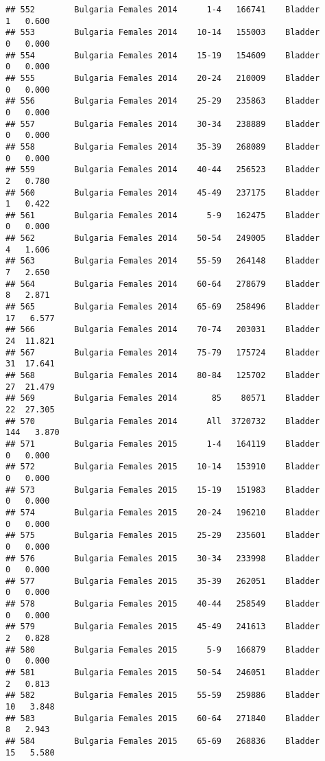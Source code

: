 \documentclass[
]{article}
\begin{document}
\begin{verbatim}
## 552        Bulgaria Females 2014      1-4   166741    Bladder      1   0.600
## 553        Bulgaria Females 2014    10-14   155003    Bladder      0   0.000
## 554        Bulgaria Females 2014    15-19   154609    Bladder      0   0.000
## 555        Bulgaria Females 2014    20-24   210009    Bladder      0   0.000
## 556        Bulgaria Females 2014    25-29   235863    Bladder      0   0.000
## 557        Bulgaria Females 2014    30-34   238889    Bladder      0   0.000
## 558        Bulgaria Females 2014    35-39   268089    Bladder      0   0.000
## 559        Bulgaria Females 2014    40-44   256523    Bladder      2   0.780
## 560        Bulgaria Females 2014    45-49   237175    Bladder      1   0.422
## 561        Bulgaria Females 2014      5-9   162475    Bladder      0   0.000
## 562        Bulgaria Females 2014    50-54   249005    Bladder      4   1.606
## 563        Bulgaria Females 2014    55-59   264148    Bladder      7   2.650
## 564        Bulgaria Females 2014    60-64   278679    Bladder      8   2.871
## 565        Bulgaria Females 2014    65-69   258496    Bladder     17   6.577
## 566        Bulgaria Females 2014    70-74   203031    Bladder     24  11.821
## 567        Bulgaria Females 2014    75-79   175724    Bladder     31  17.641
## 568        Bulgaria Females 2014    80-84   125702    Bladder     27  21.479
## 569        Bulgaria Females 2014       85    80571    Bladder     22  27.305
## 570        Bulgaria Females 2014      All  3720732    Bladder    144   3.870
## 571        Bulgaria Females 2015      1-4   164119    Bladder      0   0.000
## 572        Bulgaria Females 2015    10-14   153910    Bladder      0   0.000
## 573        Bulgaria Females 2015    15-19   151983    Bladder      0   0.000
## 574        Bulgaria Females 2015    20-24   196210    Bladder      0   0.000
## 575        Bulgaria Females 2015    25-29   235601    Bladder      0   0.000
## 576        Bulgaria Females 2015    30-34   233998    Bladder      0   0.000
## 577        Bulgaria Females 2015    35-39   262051    Bladder      0   0.000
## 578        Bulgaria Females 2015    40-44   258549    Bladder      0   0.000
## 579        Bulgaria Females 2015    45-49   241613    Bladder      2   0.828
## 580        Bulgaria Females 2015      5-9   166879    Bladder      0   0.000
## 581        Bulgaria Females 2015    50-54   246051    Bladder      2   0.813
## 582        Bulgaria Females 2015    55-59   259886    Bladder     10   3.848
## 583        Bulgaria Females 2015    60-64   271840    Bladder      8   2.943
## 584        Bulgaria Females 2015    65-69   268836    Bladder     15   5.580

\end{verbatim}
\end{document}
